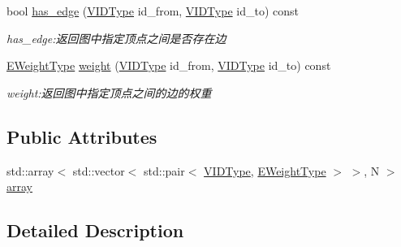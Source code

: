\begin{DoxyCompactItemize}
bool \hyperlink{struct_introdunction_to_algorithm_1_1_graph_algorithm_1_1_a_d_j_list_graph_aab4ed493b694f45ad370ecf59ecb323b}{has\+\_\+edge} (\hyperlink{struct_introdunction_to_algorithm_1_1_graph_algorithm_1_1_a_d_j_list_graph_aaa2c152e1ccafbe5556a15141d9d31b2}{V\+I\+D\+Type} id\+\_\+from, \hyperlink{struct_introdunction_to_algorithm_1_1_graph_algorithm_1_1_a_d_j_list_graph_aaa2c152e1ccafbe5556a15141d9d31b2}{V\+I\+D\+Type} id\+\_\+to) const 
\begin{DoxyCompactList}\small\item\em has\+\_\+edge\+:返回图中指定顶点之间是否存在边 \end{DoxyCompactList}\item 
\hyperlink{struct_introdunction_to_algorithm_1_1_graph_algorithm_1_1_a_d_j_list_graph_ae178ce485958d261c40b7beb8dfe9d0a}{E\+Weight\+Type} \hyperlink{struct_introdunction_to_algorithm_1_1_graph_algorithm_1_1_a_d_j_list_graph_a747a67e00d17ea000611491cefb1b7b7}{weight} (\hyperlink{struct_introdunction_to_algorithm_1_1_graph_algorithm_1_1_a_d_j_list_graph_aaa2c152e1ccafbe5556a15141d9d31b2}{V\+I\+D\+Type} id\+\_\+from, \hyperlink{struct_introdunction_to_algorithm_1_1_graph_algorithm_1_1_a_d_j_list_graph_aaa2c152e1ccafbe5556a15141d9d31b2}{V\+I\+D\+Type} id\+\_\+to) const 
\begin{DoxyCompactList}\small\item\em weight\+:返回图中指定顶点之间的边的权重 \end{DoxyCompactList}\end{DoxyCompactItemize}
\subsection*{Public Attributes}
\begin{DoxyCompactItemize}
\item 
std\+::array$<$ std\+::vector$<$ std\+::pair$<$ \hyperlink{struct_introdunction_to_algorithm_1_1_graph_algorithm_1_1_a_d_j_list_graph_aaa2c152e1ccafbe5556a15141d9d31b2}{V\+I\+D\+Type}, \hyperlink{struct_introdunction_to_algorithm_1_1_graph_algorithm_1_1_a_d_j_list_graph_ae178ce485958d261c40b7beb8dfe9d0a}{E\+Weight\+Type} $>$ $>$, N $>$ \hyperlink{struct_introdunction_to_algorithm_1_1_graph_algorithm_1_1_a_d_j_list_graph_a8474d46cb8dbe93c759752b789941fe5}{array}
\end{DoxyCompactItemize}


\subsection{Detailed Description}
